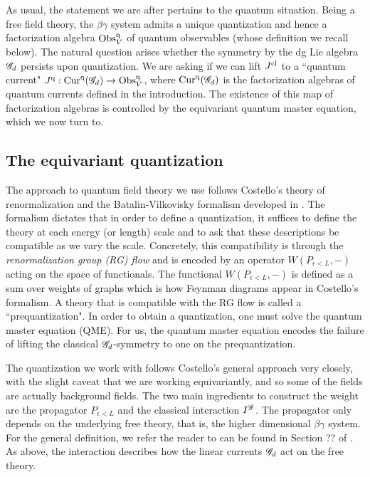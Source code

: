 \documentclass[10pt]{amsart}
\def\Cur{{\rm Cur}}
\begin{document}
As usual, the statement we are after pertains to the quantum situation. 
Being a free field theory, the $\beta\gamma$ system admits a unique quantization and hence a factorization algebra ${\rm Obs}^{{\rm q}}_V$ of quantum observables (whose definition we recall below). 
The natural question arises whether the symmetry by the dg Lie algebra $\mathscr G_d$ persists upon quantization. 
We are asking if we can lift $J^{{\rm cl}}$ to a ``quantum current" $J^{\q} : \Cur^\q(\sG_d) \to \Obs^\q_V$, where $\Cur^\q(\sG_d)$ is the factorization algebras of quantum currents defined in the introduction. 
The existence of this map of factorization algebras is controlled by the equivariant quantum master equation, which we now turn to.

\subsection{The equivariant quantization}

The approach to quantum field theory we use follows Costello's theory of renormalization and the Batalin-Vilkovisky formalism developed in \cite{CosRenorm}.
The formalism dictates that in order to define a quantization, it suffices to define the theory at each energy (or length) scale and to ask that these descriptions be compatible as we vary the scale.
Concretely, this compatibility is through the {\em renormalization group (RG) flow} and is encoded by an operator $W(P_{\epsilon < L}, -)$ acting on the space of functionals. 
The functional $W(P_{\epsilon < L},-)$ is defined as a sum over weights of graphs which is how Feynman diagrams appear in Costello's formalism.
A theory that is compatible with the RG flow is called a ``prequantization". 
In order to obtain a quantization, one must solve the quantum master equation (QME). 
For us, the quantum master equation encodes the failure of lifting the classical $\mathscr G_d$-symmetry to one on the prequantization.

The quantization we work with follows Costello's general approach very closely, with the slight caveat that we are working equivariantly, and so some of the fields are actually background fields. 
The two main ingredients to construct the weight are the propagator $P_{\epsilon < L}$ and the classical interaction $I^{\mathscr G}$. 
The propagator only depends on the underlying free theory, that is, the higher dimensional $\beta\gamma$ system. 
For the general definition, we refer the reader to can be found in Section ?? of \cite{CG2}.
As above, the interaction describes how the linear currents $\mathscr G_d$ act on the free theory. 
\end{document}
